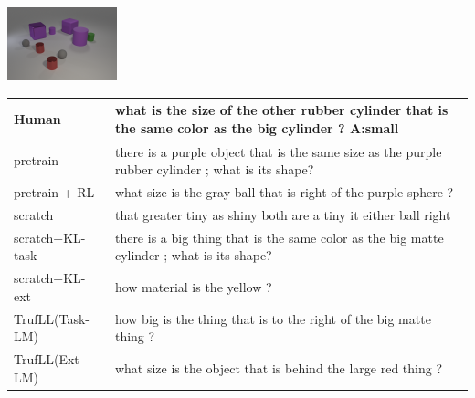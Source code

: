 \documentclass{article}
\newcommand{\algo}{TrufLL\xspace}
\begin{document}
\begin{table}[t!]
\label{clevrsamples2}
  \begin{minipage}{0.2\linewidth}
        \includegraphics[width=120px]{./CLEVR_val_004956.png}
	\end{minipage}
	\hspace{1.2cm}
	\begin{minipage}{0.80\linewidth}
		\scriptsize
		\begin{tabular}{ll}
			Human           & what is the size of the other rubber cylinder that is the same color as the big cylinder ? \quad \textbf{A:small} \\
			\midrule
			pretrain        & there is a purple object that is the same size as the purple rubber cylinder ; what is its shape? \\
		    pretrain + RL   & what size is the gray ball that is right of the purple sphere ? \\ \midrule
			scratch         & that greater tiny as shiny both are a tiny it either ball right  \\
			scratch+KL-task & there is a big thing that is the same color as the big matte cylinder ; what is its shape? \\
			scratch+KL-ext  & how material is the yellow ?\\ \midrule
			\algo(Task-LM) & how big is the thing that is to the right of the big matte thing ? \\
			\algo(Ext-LM)   & what size is the object that is behind the large red thing ? \\
			\bottomrule
		\end{tabular}
	\end{minipage}
	\vspace{1mm}
	

\end{table}
\end{document}

